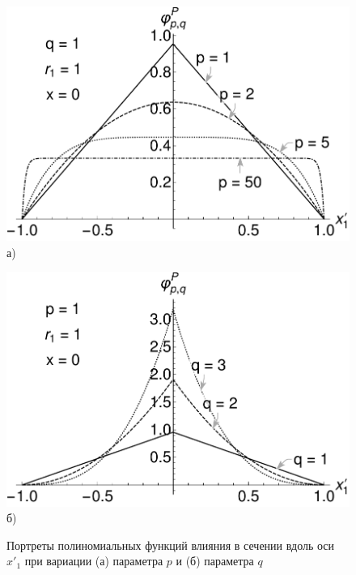 \begin{figure}[ht]
    \begin{minipage}[b][][b]{0.49\linewidth}\centering
        \includegraphics[width=\linewidth]{pics/PolynomialInfluenceP.pdf} \\ а)
    \end{minipage}
    \hfill
    \begin{minipage}[b][][b]{0.49\linewidth}\centering
        \includegraphics[width=\linewidth]{pics/PolynomialInfluenceQ.pdf} \\ б)
    \end{minipage}
    \caption{Портреты полиномиальных функций влияния в сечении вдоль оси $x'_1$ при вариации (а) параметра $p$ и (б) параметра $q$}
    \label{fig:PolynomialInfluencePortrait}
\end{figure}

